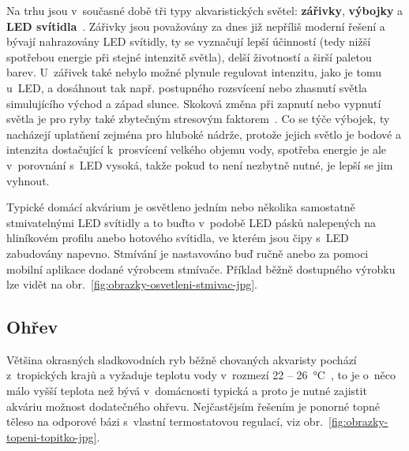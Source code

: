         Na trhu jsou v~současné době tři typy akvaristických světel: \textbf{zářivky}, \textbf{výbojky}  a \textbf{LED svítidla}~\cite{eshop-rostlinna-akvaria-svetlo}. Zářivky jsou považovány za dnes již nepříliš moderní řešení a bývají nahrazovány LED svítidly, ty se vyznačují lepší účinností (tedy nižší spotřebou energie při stejné intenzitě světla), delší životností a širší paletou barev. U~zářivek také nebylo možné plynule regulovat intenzitu, jako je tomu u~LED, a dosáhnout tak např. postupného rozsvícení nebo zhasnutí světla simulujícího východ a západ slunce. Skoková změna při zapnutí nebo vypnutí světla je pro ryby také zbytečným stresovým faktorem~\cite{MusilLibor2018Isps}. Co se týče výbojek, ty nacházejí uplatňení zejména pro hluboké nádrže, protože jejich světlo je bodové a intenzita dostačující k~prosvícení velkého objemu vody, spotřeba energie je ale v~porovnání s~LED vysoká, takže pokud to není nezbytně nutné, je lepší se jim vyhnout.   

        Typické domácí akvárium je osvětleno jedním nebo několika samostatně stmivatelnými LED svítidly a to buďto v~podobě LED pásků nalepených na hliníkovém profilu anebo hotového svítidla, ve kterém jsou čipy s~LED zabudovány napevno. Stmívání je nastavováno buď ručně anebo za pomoci mobilní aplikace dodané výrobcem stmívače. Příklad běžně dostupného výrobku lze vidět na obr.~\ref{fig:obrazky-osvetleni-stmivac-jpg}.

    \subsection{Ohřev}
        Většina okrasných sladkovodních ryb běžně chovaných akvaristy pochází z~tropických krajů a vyžaduje teplotu vody v~rozmezí 22 -- \qty{26}{\degreeCelsius}~\cite{slavotinek2014}, to je o~něco málo vyšší teplota než bývá v~domácnosti typická a proto je nutné zajistit akváriu možnost dodatečného ohřevu. Nejčastějsím řešením je ponorné topné těleso na odporové bázi s~vlastní termostatovou regulací, viz obr.~\ref{fig:obrazky-topeni-topitko-jpg}.

